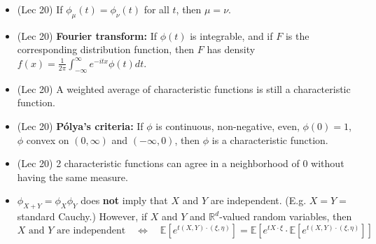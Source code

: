 \documentclass[twoside]{article}
\newcommand{\dis}{\displaystyle}
\newcommand\bbE{\mathbb{E}}
\newcommand\bbR{\mathbb{R}}
\begin{document}
\begin{itemize}
\item (Lec 20) If $\phi_\mu (t) = \phi_\nu (t)$ for all $t$, then $\mu = \nu$.

\item (Lec 20) \textbf{Fourier transform:} If $\phi(t)$ is integrable, and if $F$ is the corresponding distribution function, then $F$ has density $f(x) = \dis\frac{1}{2\pi}\int_{-\infty}^\infty e^{-itx}\phi(t) dt$.

\item (Lec 20) A weighted average of characteristic functions is still a characteristic function.

\item (Lec 20) \textbf{P\'{o}lya's criteria:} If $\phi$ is continuous, non-negative, even, $\phi(0) = 1$, $\phi$ convex on $(0, \infty)$ and $(-\infty, 0)$, then $\phi$ is a characteristic function.

\item (Lec 20) 2 characteristic functions can agree in a neighborhood of 0 without having the same measure.

\item $\phi_{X+Y} = \phi_X \phi_Y$ does \textbf{not} imply that $X$ and $Y$ are independent. (E.g. $X = Y =$ standard Cauchy.) However, if $X$ and $Y$ and $\bbR^d$-valued random variables, then
\[ \text{$X$ and $Y$ are independent} \quad \Leftrightarrow \quad \bbE \left[ e^{t (X, Y) \cdot (\xi, \eta)} \right] = \bbE \left[ e^{t X \cdot \xi} \cdot \bbE \left[ e^{t (X, Y) \cdot (\xi, \eta)} \right] \right] \]

\end{itemize}
\end{document}

